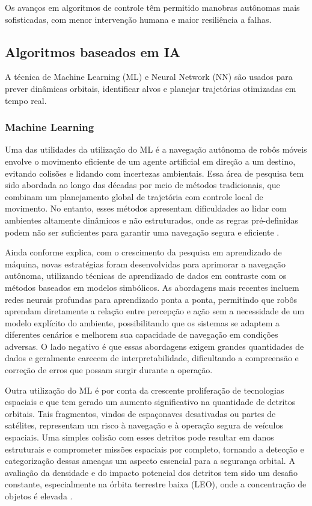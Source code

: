 Os avanços em algoritmos de controle têm permitido manobras autônomas mais sofisticadas, com menor intervenção humana e maior resiliência a falhas.

\subsection{Algoritmos baseados em IA}

A técnica de Machine Learning (ML) e Neural Network (NN) são usados para prever dinâmicas orbitais, identificar alvos e planejar trajetórias otimizadas em tempo real.

\subsubsection{Machine Learning}

Uma das utilidades da utilização do ML é a navegação autônoma de robôs móveis envolve o movimento eficiente de um agente artificial em direção a um destino, evitando colisões e lidando com incertezas ambientais. Essa área de pesquisa tem sido abordada ao longo das décadas por meio de métodos tradicionais, que combinam um planejamento global de trajetória com controle local de movimento. No entanto, esses métodos apresentam dificuldades ao lidar com ambientes altamente dinâmicos e não estruturados, onde as regras pré-definidas podem não ser suficientes para garantir uma navegação segura e eficiente \cite{xiao2022}.

Ainda conforme \cite{xiao2022} explica, com o crescimento da pesquisa em aprendizado de máquina, novas estratégias foram desenvolvidas para aprimorar a navegação autônoma, utilizando técnicas de aprendizado de dados em contraste com os métodos baseados em modelos simbólicos. As abordagens mais recentes incluem redes neurais profundas para aprendizado ponta a ponta, permitindo que robôs aprendam diretamente a relação entre percepção e ação sem a necessidade de um modelo explícito do ambiente, possibilitando que os sistemas se adaptem a diferentes cenários e melhorem sua capacidade de navegação em condições adversas. O lado negativo é que essas abordagens exigem grandes quantidades de dados e geralmente carecem de interpretabilidade, dificultando a compreensão e correção de erros que possam surgir durante a operação.

Outra utilização do ML é por conta da crescente proliferação de tecnologias espaciais e que tem gerado um aumento significativo na quantidade de detritos orbitais. Tais fragmentos, vindos de espaçonaves desativadas ou partes de satélites, representam um risco à navegação e à operação segura de veículos espaciais. Uma simples colisão com esses detritos pode resultar em danos estruturais e comprometer missões espaciais por completo, tornando a detecção e categorização dessas ameaças um aspecto essencial para a segurança orbital. A avaliação da densidade e do impacto potencial dos detritos tem sido um desafio constante, especialmente na órbita terrestre baixa (LEO), onde a concentração de objetos é elevada \cite{sri2024}.

